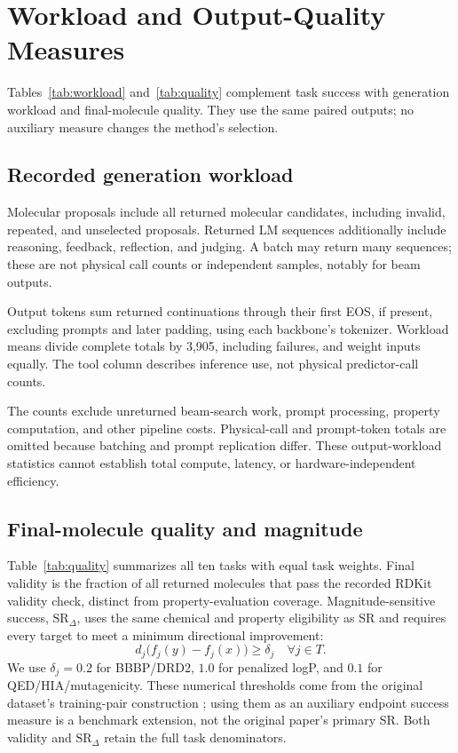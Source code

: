 \section{Workload and Output-Quality Measures}
\label{sec:metrics}
Tables~\ref{tab:workload} and~\ref{tab:quality} complement task success with generation workload and final-molecule quality. They use the same paired outputs; no auxiliary measure changes the method's selection.

\subsection{Recorded generation workload}
Molecular proposals include all returned molecular candidates, including invalid, repeated, and unselected proposals. Returned LM sequences additionally include reasoning, feedback, reflection, and judging. A batch may return many sequences; these are not physical call counts or independent samples, notably for beam outputs.

Output tokens sum returned continuations through their first EOS, if present, excluding prompts and later padding, using each backbone's tokenizer. Workload means divide complete totals by 3,905, including failures, and weight inputs equally. The tool column describes inference use, not physical predictor-call counts.

The counts exclude unreturned beam-search work, prompt processing, property computation, and other pipeline costs. Physical-call and prompt-token totals are omitted because batching and prompt replication differ. These output-workload statistics cannot establish total compute, latency, or hardware-independent efficiency.

\subsection{Final-molecule quality and magnitude}
Table~\ref{tab:quality} summarizes all ten tasks with equal task weights. Final validity is the fraction of all returned molecules that pass the recorded RDKit validity check, distinct from property-evaluation coverage. Magnitude-sensitive success, $\mathrm{SR}_{\Delta}$, uses the same chemical and property eligibility as SR and requires every target to meet a minimum directional improvement:
\begin{equation}
 d_j\bigl(f_j(y)-f_j(x)\bigr)\geq\delta_j \quad\forall j\in T.
\end{equation}
We use $\delta_j=0.2$ for BBBP/DRD2, $1.0$ for penalized logP, and $0.1$ for QED/HIA/mutagenicity. These numerical thresholds come from the original dataset's training-pair construction \citep{gellmo2025}; using them as an auxiliary endpoint success measure is a benchmark extension, not the original paper's primary SR. Both validity and $\mathrm{SR}_{\Delta}$ retain the full task denominators.

